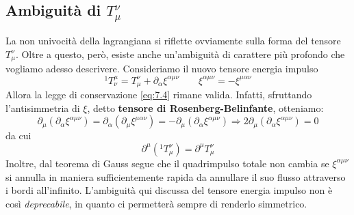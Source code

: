 \documentclass[a4paper,11pt]{book}
\theoremstyle{plain}
\theoremstyle{definition}
\begin{document}
\subsection{Ambiguità di $T^{\nu}_{\mu}$}
La non univocità della lagrangiana si riflette ovviamente sulla forma del tensore $T^{\nu}_{\mu}$. Oltre a questo, però, esiste anche un'ambiguità di carattere più profondo che vogliamo adesso descrivere. Consideriamo il nuovo tensore energia impulso
\begin{equation}
^1 T_{\nu}^{\mu}=T_{\mu}^{\nu}+\partial_{\alpha}\xi^{\alpha\mu\nu} \qquad \xi^{\alpha\mu\nu} = -\xi^{\mu\alpha\nu}
\end{equation}
Allora la legge di conservazione \eqref{eq:7.4} rimane valida. Infatti, sfruttando l'antisimmetria di $\xi$, detto \textbf{tensore di Rosenberg-Belinfante}, otteniamo:
\[
\partial_{\mu}(\partial_{\alpha}\xi^{\alpha\mu\nu}) = \partial_{\alpha}(\partial_{\mu}\xi^{\mu\alpha\nu}) = - \partial_{\mu}(\partial_{\alpha}\xi^{\alpha\mu\nu}) \Longrightarrow 2\partial_{\mu}(\partial_{\alpha}\xi^{\alpha\mu\nu}) = 0
\]
da cui
\[
\partial^{\mu} (^1 T_{\mu}^{\nu}) = \partial^{\mu} T_{\mu}^{\nu}
\]
Inoltre, dal teorema di Gauss segue che il quadrimpulso totale non cambia se $\xi^{\alpha\mu\nu}$ si annulla in maniera sufficientemente rapida da annullare il suo flusso attraverso i bordi all'infinito. L'ambiguità qui discussa del tensore energia impulso non è così \emph{deprecabile}, in quanto ci permetterà sempre di renderlo simmetrico. 
\end{document}
